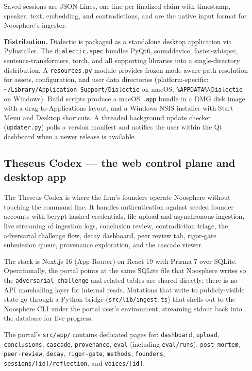 \documentclass[11pt,letterpaper]{article}
\newcommand{\file}[1]{\texttt{#1}}
\begin{document}
Saved sessions are JSON Lines, one line per finalized claim with timestamp, speaker, text, embedding, and contradictions, and are the native input format for Noosphere's ingester.

\textbf{Distribution.} Dialectic is packaged as a standalone desktop application via PyInstaller. The \file{dialectic.spec} bundles PyQt6, sounddevice, faster-whisper, sentence-transformers, torch, and all supporting libraries into a single-directory distribution. A \file{resources.py} module provides frozen-mode-aware path resolution for assets, configuration, and user data directories (platform-specific: \file{\textasciitilde/Library/Application Support/Dialectic} on macOS, \file{\%APPDATA\%\textbackslash Dialectic} on Windows). Build scripts produce a macOS \texttt{.app} bundle in a DMG disk image with a drag-to-Applications layout, and a Windows NSIS installer with Start Menu and Desktop shortcuts. A threaded background update checker (\file{updater.py}) polls a version manifest and notifies the user within the Qt dashboard when a newer release is available.

\subsection{Theseus Codex --- the web control plane and desktop app}

The Theseus Codex is where the firm's founders operate Noosphere without touching the command line. It handles authentication against seeded founder accounts with bcrypt-hashed credentials, file upload and asynchronous ingestion, live streaming of ingestion logs, conclusion review, contradiction triage, the adversarial challenge flow, decay dashboard, peer review tab, rigor-gate submission queue, provenance exploration, and the cascade viewer.

The stack is Next.js 16 (App Router) on React 19 with Prisma 7 over SQLite. Operationally, the portal points at the same SQLite file that Noosphere writes so the \file{adversarial\_challenge} and related tables are shared directly; there is no API marshalling layer for internal reads. Mutations that write to publicly-visible state go through a Python bridge (\file{src/lib/ingest.ts}) that shells out to the Noosphere CLI under the portal user's environment, streaming stdout back into the database for live progress.

The portal's \file{src/app/} contains dedicated pages for: \file{dashboard}, \file{upload}, \file{conclusions}, \file{cascade}, \file{provenance}, \file{eval} (including \file{eval/runs}), \file{post-mortem}, \file{peer-review}, \file{decay}, \file{rigor-gate}, \file{methods}, \file{founders}, \file{sessions/[id]/reflection}, and \file{voices/[id]}.
\end{document}
